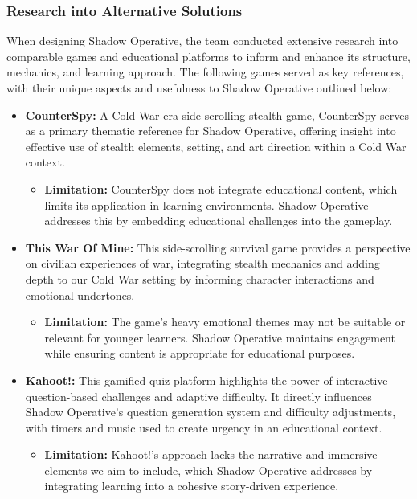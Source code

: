 \documentclass[11pt, a4paper]{article}
\begin{document}
\subsubsection{Research into Alternative Solutions}

\noindent When designing Shadow Operative, the team conducted extensive research into comparable games and educational platforms to inform and enhance its structure, mechanics, and learning approach. The following games served as key references, with their unique aspects and usefulness to Shadow Operative outlined below:

\begin{itemize}
    \item \textbf{CounterSpy:} A Cold War-era side-scrolling stealth game, CounterSpy serves as a primary thematic reference for Shadow Operative, offering insight into effective use of stealth elements, setting, and art direction within a Cold War context.
          \begin{itemize}
              \item \textbf{Limitation:} CounterSpy does not integrate educational content, which limits its application in learning environments. Shadow Operative addresses this by embedding educational challenges into the gameplay.
          \end{itemize}

    \item \textbf{This War Of Mine:} This side-scrolling survival game provides a perspective on civilian experiences of war, integrating stealth mechanics and adding depth to our Cold War setting by informing character interactions and emotional undertones.
          \begin{itemize}
              \item \textbf{Limitation:} The game's heavy emotional themes may not be suitable or relevant for younger learners. Shadow Operative maintains engagement while ensuring content is appropriate for educational purposes.
          \end{itemize}

    \item \textbf{Kahoot!:} This gamified quiz platform highlights the power of interactive question-based challenges and adaptive difficulty. It directly influences Shadow Operative's question generation system and difficulty adjustments, with timers and music used to create urgency in an educational context.
          \begin{itemize}
              \item \textbf{Limitation:} Kahoot!'s approach lacks the narrative and immersive elements we aim to include, which Shadow Operative addresses by integrating learning into a cohesive story-driven experience.
          \end{itemize}
\end{itemize}
\end{document}
